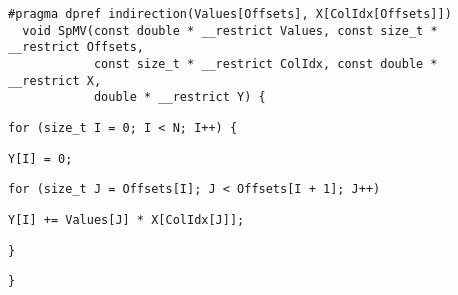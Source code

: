 \begin{lstlisting}[style=cppcode]
  #pragma dpref indirection(Values[Offsets], X[ColIdx[Offsets]])
  void SpMV(const double * __restrict Values, const size_t * __restrict Offsets,
            const size_t * __restrict ColIdx, const double * __restrict X,
            double * __restrict Y) {
\end{lstlisting}\vspace{-\baselineskip}

\begin{lstlisting}[style=cppcode, backgroundcolor=\color{yellow!15}, firstnumber=last]
    for (size_t I = 0; I < N; I++) {
\end{lstlisting}\vspace{-\baselineskip}

\begin{lstlisting}[style=cppcode, backgroundcolor=\color{green!15}, firstnumber=last]
      Y[I] = 0;
\end{lstlisting}\vspace{-\baselineskip}

\begin{lstlisting}[style=cppcode, backgroundcolor=\color{red!15}, firstnumber=last]
      for (size_t J = Offsets[I]; J < Offsets[I + 1]; J++)
\end{lstlisting}\vspace{-\baselineskip}

\begin{lstlisting}[style=cppcode, backgroundcolor=\color{green!15}, firstnumber=last]
        Y[I] += Values[J] * X[ColIdx[J]];
\end{lstlisting}\vspace{-\baselineskip}

\begin{lstlisting}[style=cppcode, backgroundcolor=\color{yellow!15}, firstnumber=last]
    }
\end{lstlisting}\vspace{-\baselineskip}

\begin{lstlisting}[style=cppcode, firstnumber=last]
  }
\end{lstlisting}\vspace{-\baselineskip}
